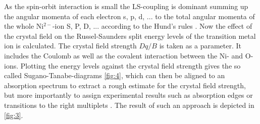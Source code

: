 As the spin-orbit interaction is small the LS-coupling is dominant summing up the angular momenta of each electron s, p, d, ... to the total angular momenta of the whole Ni$^{2-}$-ion S, P, D, ... according to the Hund's rules \cite{ogale_functional_2013}.
Now the effect of the crystal field on the Russel-Saunders split energy levels of the transition metal ion is calculated.
The crystal field strength $Dq/B$ is taken as a parameter.
It includes the Coulomb as well as the covalent interaction between the Ni- and O-ions.
Plotting the energy levels against the crystal field strength gives the so called Sugano-Tanabe-diagrams \autoref{fig:4}, which can then be aligned to an absorption spectrum to extract a rough estimate for the crystal field strength, but more importantly to assign experimental results such as absorption edges or transitions to the right multiplets \cite{fromme_b_d-d_2001}.
The result of such an approach is depicted in \autoref{fig:3}.
